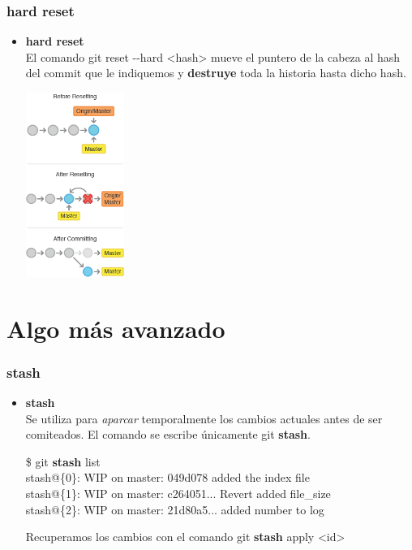 \frame
{
\frametitle{hard reset}
\begin{itemize}
 \item \textbf{hard reset}\\ \indent
 El comando git reset -{}-hard <hash> mueve el puntero de la cabeza al hash del commit que le indiquemos y \textbf{destruye} toda la historia hasta dicho hash.\\
 \begin{center}
    \includegraphics[height=6cm]{imgs/reset-hard.png}
 \end{center}
\end{itemize}
}

\section{Algo más avanzado}
\frame
{
\frametitle{stash}
\begin{itemize}
 \item \textbf{stash}\\ \indent
 Se utiliza para \textit{aparcar} temporalmente los cambios actuales antes de ser comiteados. El comando se escribe únicamente git \textbf{stash}.
 \begin{framed}
 \$ git \textbf{stash} list\\
 stash@\{0\}: WIP on master: 049d078 added the index file\\
 stash@\{1\}: WIP on master: c264051... Revert added file\_size\\
 stash@\{2\}: WIP on master: 21d80a5... added number to log
 \end{framed}
 
 Recuperamos los cambios con el comando git \textbf{stash} apply <id>
\end{itemize}
}

